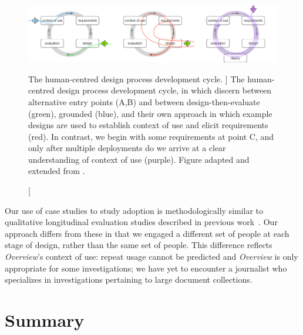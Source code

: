  \begin{figure}
	\centering
	\includegraphics[width=\textwidth]{figures/hcd-loops}
	\caption
	[
	    The human-centred design process development cycle.
	]
	{
	    The human-centred design process development cycle, in which \citet{Lloyd2011} discern between alternative entry points (A,B) and between design-then-evaluate (green), grounded (blue), and their own approach in which example designs are used to establish context of use and elicit requirements (red). In contrast, we begin with some requirements at point C, and only after multiple deployments do we arrive at a clear understanding of context of use (purple). Figure adapted and extended from \citet{Lloyd2011}.
	}
	\centering
	\label{overview:fig:hcd-loops}
\end{figure}


Our use of case studies to study adoption is methodologically similar to qualitative longitudinal evaluation studies described in previous work~\cite{Lloyd2011,Saraiya2006,Shneiderman2006}.
Our approach differs from these in that we engaged a different set of people at each stage of design, rather than the same set of people.
This difference reflects {\it Overview}'s context of use: repeat usage cannot be predicted and {\it Overview} is only appropriate for some investigations; we have yet to encounter a journalist who specializes in investigations pertaining to large document collections.


\section{Summary}
\label{overview:conclusion}

